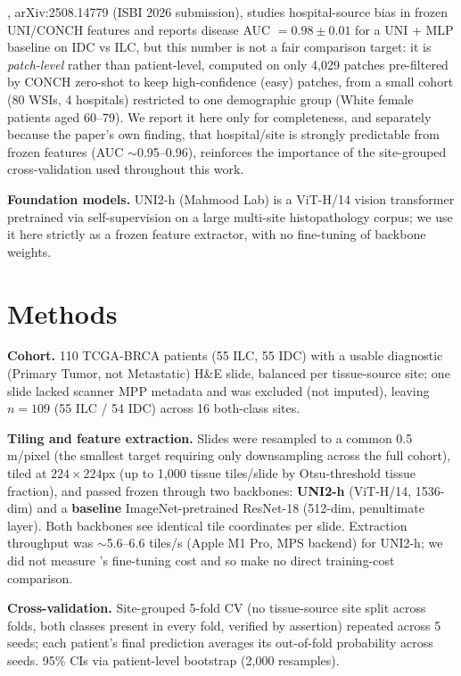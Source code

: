 \documentclass{article}
\begin{document}
\textbf{\citet{zhang2025hospital}}, arXiv:2508.14779 (ISBI 2026 submission), studies hospital-source bias in frozen UNI/CONCH features and reports disease AUC $=0.98\pm0.01$ for a UNI + MLP baseline on IDC vs ILC, but this number is not a fair comparison target: it is \emph{patch-level} rather than patient-level, computed on only 4{,}029 patches pre-filtered by CONCH zero-shot to keep high-confidence (easy) patches, from a small cohort (80 WSIs, 4 hospitals) restricted to one demographic group (White female patients aged 60--79). We report it here only for completeness, and separately because the paper's own finding, that hospital/site is strongly predictable from frozen features (AUC $\sim$0.95--0.96), reinforces the importance of the site-grouped cross-validation used throughout this work.

\textbf{Foundation models.} UNI2-h (Mahmood Lab) is a ViT-H/14 vision transformer pretrained via self-supervision on a large multi-site histopathology corpus; we use it here strictly as a frozen feature extractor, with no fine-tuning of backbone weights.

\section{Methods}

\textbf{Cohort.} 110 TCGA-BRCA patients (55 ILC, 55 IDC) with a usable diagnostic (Primary Tumor, not Metastatic) H\&E slide, balanced per tissue-source site; one slide lacked scanner MPP metadata and was excluded (not imputed), leaving $n=109$ (55 ILC / 54 IDC) across 16 both-class sites.

\textbf{Tiling and feature extraction.} Slides were resampled to a common 0.5\,\textmu m/pixel (the smallest target requiring only downsampling across the full cohort), tiled at $224\times224$px (up to 1{,}000 tissue tiles/slide by Otsu-threshold tissue fraction), and passed frozen through two backbones: \textbf{UNI2-h} (ViT-H/14, 1536-dim) and a \textbf{baseline} ImageNet-pretrained ResNet-18 (512-dim, penultimate layer). Both backbones see identical tile coordinates per slide. Extraction throughput was $\sim$5.6--6.6 tiles/s (Apple M1 Pro, MPS backend) for UNI2-h; we did not measure \citeauthor{ektefaie2021integrative}'s fine-tuning cost and so make no direct training-cost comparison.

\textbf{Cross-validation.} Site-grouped 5-fold CV (no tissue-source site split across folds, both classes present in every fold, verified by assertion) repeated across 5 seeds; each patient's final prediction averages its out-of-fold probability across seeds. 95\% CIs via patient-level bootstrap (2{,}000 resamples).
\end{document}
